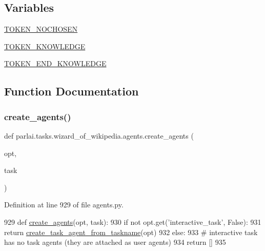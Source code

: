 \subsection*{Variables}
\begin{DoxyCompactItemize}
\item 
\hyperlink{namespaceparlai_1_1tasks_1_1wizard__of__wikipedia_1_1agents_a09d5b8be32016dd453d5693a3783d5ca}{T\+O\+K\+E\+N\+\_\+\+N\+O\+C\+H\+O\+S\+EN}
\item 
\hyperlink{namespaceparlai_1_1tasks_1_1wizard__of__wikipedia_1_1agents_a8027e49c1ff6e792fde5385a5146e40a}{T\+O\+K\+E\+N\+\_\+\+K\+N\+O\+W\+L\+E\+D\+GE}
\item 
\hyperlink{namespaceparlai_1_1tasks_1_1wizard__of__wikipedia_1_1agents_a15d544ca026e73b33e93827df9d2f97f}{T\+O\+K\+E\+N\+\_\+\+E\+N\+D\+\_\+\+K\+N\+O\+W\+L\+E\+D\+GE}
\end{DoxyCompactItemize}


\subsection{Function Documentation}
\mbox{\label{namespaceparlai_1_1tasks_1_1wizard__of__wikipedia_1_1agents_a89bd55d60a50f2604b1eb59ab0e064bc}} 
\subsubsection{\texorpdfstring{create\+\_\+agents()}{create\_agents()}}
{\footnotesize\ttfamily def parlai.\+tasks.\+wizard\+\_\+of\+\_\+wikipedia.\+agents.\+create\+\_\+agents (\begin{DoxyParamCaption}\item[{}]{opt,  }\item[{}]{task }\end{DoxyParamCaption})}



Definition at line 929 of file agents.\+py.


\begin{DoxyCode}
929 \textcolor{keyword}{def }\hyperlink{namespaceparlai_1_1tasks_1_1wizard__of__wikipedia_1_1agents_a89bd55d60a50f2604b1eb59ab0e064bc}{create\_agents}(opt, task):
930     \textcolor{keywordflow}{if} \textcolor{keywordflow}{not} opt.get(\textcolor{stringliteral}{'interactive\_task'}, \textcolor{keyword}{False}):
931         \textcolor{keywordflow}{return} \hyperlink{namespaceparlai_1_1core_1_1agents_ab4473fa54af02b5ab385b41b51dacd10}{create\_task\_agent\_from\_taskname}(opt)
932     \textcolor{keywordflow}{else}:
933         \textcolor{comment}{# interactive task has no task agents (they are attached as user agents)}
934         \textcolor{keywordflow}{return} []
935 \end{DoxyCode}


